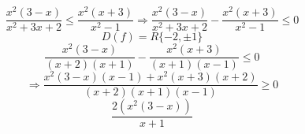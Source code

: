 \documentclass{article}
\begin{document}
\[ \frac{x^2(3-x)}{x^2+3x+2} \le \frac{x^2(x+3)}{x^2-1} \Rightarrow \frac{x^2(3-x)}{x^2+3x+2} - \frac{x^2(x+3)}{x^2-1} \le 0 \]
\[ D(f)=R \{-2, \pm1\} \]
\[ \frac{x^2(3-x)}{(x+2)(x+1)} - \frac{x^2(x+3)}{(x+1)(x-1)} \le 0 \]
\[ \Rightarrow \frac{x^2(3-x)(x-1) + x^2(x+3)(x+2)}{(x+2)(x+1)(x-1)} \ge 0 \]
\[ \frac{2(x^2(3-x))}{x+1} \]
\end{document}
